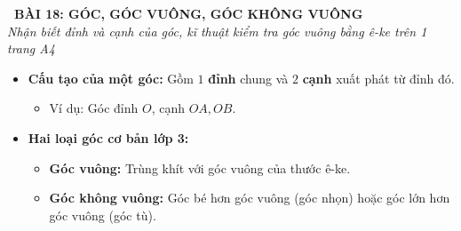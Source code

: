 \documentclass[12pt,a4paper]{article}
\begin{document}
\begin{tcolorbox}[
  enhanced,
  colback=teal!8!white,
  colframe=teal!70!black,
  arc=3mm, boxrule=1.2pt,
  left=3mm, right=3mm, top=2mm, bottom=2mm,
  halign=center
]
  {\LARGE\bfseries\color{teal!90!black}\faBookmark\ BÀI 18: GÓC, GÓC VUÔNG, GÓC KHÔNG VUÔNG}\\[1mm]
  {\itshape\footnotesize\color{black!75} Nhận biết đỉnh và cạnh của góc, kĩ thuật kiểm tra góc vuông bằng ê-ke trên 1 trang A4}
\end{tcolorbox}

\vspace{-2mm}

\noindent
\begin{minipage}[t]{0.49\textwidth}\vspace{0pt}
\begin{tcolorbox}[
  enhanced,
  colback=blue!4!white,
  colframe=blue!75!black,
  arc=2mm, boxrule=0.8pt,
  left=2mm, right=2mm, top=1.8mm, bottom=1.8mm,
  title={\footnotesize\bfseries\color{white}\faCheckSquare\ 1. Khái niệm Góc \& Phân loại}
]
{\footnotesize
\begin{itemize}\setlength{\itemsep}{1pt}\setlength{\leftskip}{-2.5mm}
  \item \textbf{Cấu tạo của một góc:} Gồm $1$ \textbf{đỉnh} chung và $2$ \textbf{cạnh} xuất phát từ đỉnh đó.
  \begin{itemize}\setlength{\itemsep}{0.5pt}\setlength{\leftskip}{-2.5mm}
    \item Ví dụ: Góc đỉnh $O$, cạnh $OA, OB$.
  \end{itemize}
  \item \textbf{Hai loại góc cơ bản lớp 3:}
  \begin{itemize}\setlength{\itemsep}{0.5pt}\setlength{\leftskip}{-2.5mm}
    \item \textbf{Góc vuông:} Trùng khít với góc vuông của thước ê-ke.
    \item \textbf{Góc không vuông:} Góc bé hơn góc vuông (góc nhọn) hoặc góc lớn hơn góc vuông (góc tù).
  \end{itemize}
\end{itemize}
}
\end{tcolorbox}
\end{minipage}
\hfill
\end{document}
